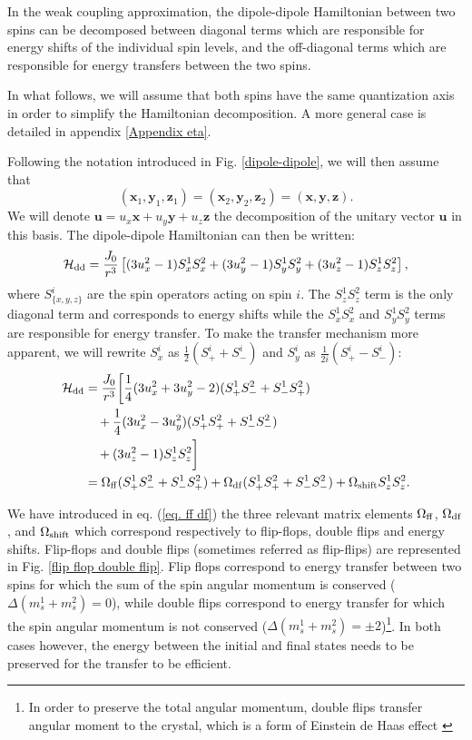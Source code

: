 \documentclass[a4paper, 11pt]{report}
\begin{document}
In the weak coupling approximation, the dipole-dipole Hamiltonian between two spins can be decomposed between diagonal terms which are responsible for energy shifts of the individual spin levels, and the off-diagonal terms which are responsible for energy transfers between the two spins.

In what follows, we will assume that both spins have the same quantization axis in order to simplify the Hamiltonian decomposition. A more general case is detailed in appendix \ref{Appendix eta}.

Following the notation introduced in Fig. \ref{dipole-dipole}, we will then assume that $$(\mathbf{x}_1,\mathbf{y}_1,\mathbf{z}_1) = (\mathbf{x}_2,\mathbf{y}_2,\mathbf{z}_2) = (\mathbf{x},\mathbf{y},\mathbf{z}).$$ We will denote $\mathbf{u}=u_x \mathbf{x} + u_y \mathbf{y} + u_z \mathbf{z}$ the decomposition of the unitary vector $\mathbf{u}$ in this basis. The dipole-dipole Hamiltonian can then be written:
\begin{equation}
\mathcal{H}_{\rm dd}=\frac{J_0}{r^3}\left[ (3 u_x^2-1) S_x^1 S_x^2 + (3 u_y^2-1) S_y^1 S_y^2 + (3 u_z^2-1) S_z^1 S_z^2 \right],
\end{equation}
where $S_{\{x,y,z\} }^i$ are the spin operators acting on spin $i$. The $S_z^1 S_z^2$ term is the only diagonal term and corresponds to energy shifts while the $S_x^1 S_x^2$ and $S_y^1 S_y^2$ terms are responsible for energy transfer. To make the transfer mechanism more apparent, we will rewrite $S_x^i$ as $\frac{1}{2}(S_+^i+S_-^i)$ and $S_y^i$ as $\frac{1}{2i}(S_+^i-S_-^i)$:
\begin{align}
\mathcal{H}_{\rm dd}&=\frac{J_0}{r^3}\bigg{[} \frac{1}{4}(3 u_x^2 + 3 u_y^2 -2)(S_+^1 S_-^2 + S_-^1 S_+^2) \nonumber \\
&\quad + \frac{1}{4}(3 u_x^2 - 3 u_y^2)(S_+^1 S_+^2 + S_-^1 S_-^2) \nonumber \\
&\quad +(3 u_z^2-1) S_z^1 S_z^2 \bigg{]} \nonumber \\
\medskip
&= \Omega_{\rm ff} (S_+^1 S_-^2 + S_-^1 S_+^2) + \Omega_{\rm df} (S_+^1 S_+^2 + S_-^1 S_-^2) + \Omega_{\rm shift} S_z^1 S_z^2. \label{eq. ff df}
\end{align}

We have introduced in eq. (\ref{eq. ff df}) the three relevant matrix elements $\Omega_{\rm ff}$, $\Omega_{\rm df}$, and $\Omega_{\rm shift}$ which correspond respectively to flip-flops, double flips and energy shifts. Flip-flops and double flips (sometimes referred as flip-flips) are represented in Fig. \ref{flip flop double flip}. Flip flops correspond to energy transfer between two spins for which the sum of the spin angular momentum is conserved ($\Delta (m_s^1+m_s^2)=0$), while double flips correspond to energy transfer for which the spin angular momentum is not conserved ($\Delta (m_s^1+m_s^2)=\pm 2$)\footnote{In order to preserve the total angular momentum, double flips transfer angular moment to the crystal, which is a form of Einstein de Haas effect \citep{einstein1915experimental} }. In both cases however, the energy between the initial and final states needs to be preserved for the transfer to be efficient. 
\end{document}
